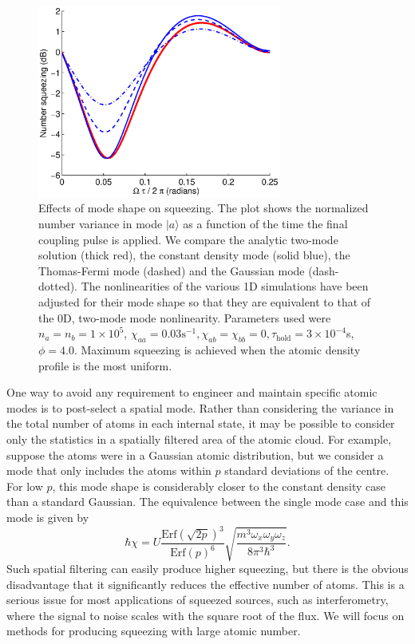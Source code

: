 \documentclass{iopart}
\begin{document}
\begin{figure}
    \centering
    \includegraphics[width=8cm]{figures/modal_squeezing_effects_1D.eps}
    \caption{Effects of mode shape on squeezing. The plot shows the normalized number variance in mode $|a \rangle$ as a function of the time the final coupling pulse is applied. We compare the analytic two-mode solution (thick red), the constant density mode (solid blue), the Thomas-Fermi mode (dashed) and the Gaussian mode (dash-dotted). The nonlinearities of the various 1D simulations have been adjusted for their mode shape so that they are equivalent to that of the 0D, two-mode mode nonlinearity. Parameters used were $n_a = n_b =1 \times 10^5$, $\chi_{aa}=0.03 \text{s}^{-1}, \chi_{ab}=\chi_{bb}=0, \tau_{\mathrm{hold}}=3\times 10^{-4}$s, $\phi=4.0$. Maximum squeezing is achieved when the atomic density profile is the most uniform.}
    \label{figModalSqueezingEffects1D}
\end{figure}

One way to avoid any requirement to engineer and maintain specific atomic modes is to post-select a spatial mode.  Rather than considering the variance in the total number of atoms in each internal state, it may be possible to consider only the statistics in a spatially filtered area of the atomic cloud.  For example, suppose the atoms were in a Gaussian atomic distribution, but we consider a mode that only includes the atoms within $p$ standard deviations of the centre. For low $p$, this mode shape is considerably closer to the constant density case than a standard Gaussian. The equivalence between the single mode case and this mode is given by
\begin{equation}
\hbar\chi = U \frac{{\mathrm{Erf}} (\sqrt{2p})^3}{{\mathrm{Erf}}(p)^6} \sqrt{\frac{m^3 \omega_x \omega_y \omega_z}{8 \pi^3 \hbar^3}}.
\end{equation}
Such spatial filtering can easily produce higher squeezing, but there is the obvious disadvantage that it  significantly reduces the effective number of atoms.  This is a serious issue for most applications of squeezed sources, such as interferometry, where the signal to noise scales with the square root of the flux.  We will focus on methods for producing squeezing with large atomic number.
\end{document}
